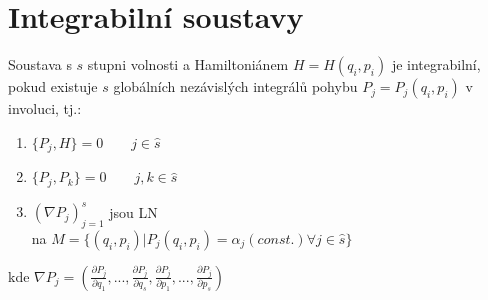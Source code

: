 \documentclass[a5paper,12pt]{article}
\begin{document}
\section{Integrabilní soustavy}

Soustava s $s$ stupni volnosti a Hamiltoniánem $H=H(q_i,p_i)$ je integrabilní, pokud existuje $s$ globálních nezávislých integrálů pohybu $P_j = P_j(q_i, p_i)$ v involuci, tj.:
\begin{enumerate}
	\item $\{P_j, H\} = 0 \qquad j \in \hat{s}$
	\item $\{P_j, P_k\} = 0 \qquad j,k \in \hat{s}$
	\item $(\nabla P_j)_{j=1}^{s}$ jsou LN\\ 
	na $M = \{(q_i, p_i) | P_j(q_i, p_i) = \alpha_j (const.) \forall j \in \hat{s} \}$
\end{enumerate}

\noindent kde $\nabla P_j = (\frac{\partial P_j}{\partial q_1}, ..., \frac{\partial P_j}{\partial q_s}, \frac{\partial P_j}{\partial p_1}, ..., \frac{\partial P_j}{\partial p_s})$
\end{document}
